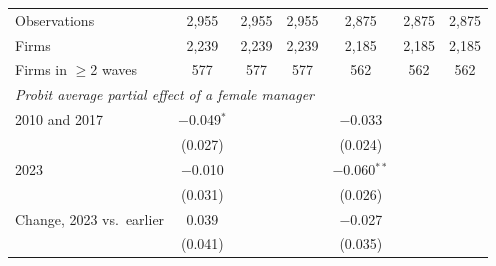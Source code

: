 \begin{tabular}{lcccccc}
Observations & 2,955 & 2,955 & 2,955 & 2,875 & 2,875 & 2,875 \\
Firms & 2,239 & 2,239 & 2,239 & 2,185 & 2,185 & 2,185 \\
Firms in $\geq$2 waves & 577 & 577 & 577 & 562 & 562 & 562 \\
\midrule
\multicolumn{7}{l}{\textit{Probit average partial effect of a female manager}} \\
2010 and 2017 & $-$0.049$^{*}$ & & & $-$0.033 & & \\
 & (0.027) & & & (0.024) & & \\
2023 & $-$0.010 & & & $-$0.060$^{**}$ & & \\
 & (0.031) & & & (0.026) & & \\
Change, 2023 vs.\ earlier & 0.039 & & & $-$0.027 & & \\
 & (0.041) & & & (0.035) & & \\
\bottomrule
\end{tabular}
